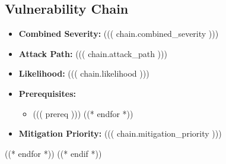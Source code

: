 \documentclass{article}
\begin{document}
    \subsection{Vulnerability Chain}
    \begin{itemize}
        \item \textbf{Combined Severity:} ((( chain.combined_severity )))
        \item \textbf{Attack Path:} ((( chain.attack_path )))
        \item \textbf{Likelihood:} ((( chain.likelihood )))
        \item \textbf{Prerequisites:}
           \begin{itemize}
            ((* for prereq in chain.prerequisites *))
                \item ((( prereq )))
            ((* endfor *))
            \end{itemize}
        \item \textbf{Mitigation Priority: }((( chain.mitigation_priority )))
    \end{itemize}
 ((* endfor *))
((* endif *))
\end{document}
